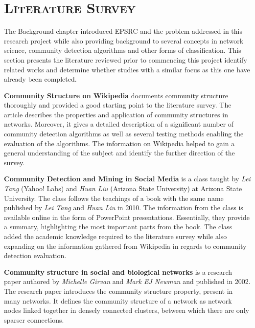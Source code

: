 \chapter{\textsc{Literature Survey}}
\label{chapterlabel3}

The Background chapter introduced EPSRC and the problem addressed in this research project while also providing background to several concepts in network science, community detection algorithms and other forms of classification. This section presents the literature reviewed prior to commencing this project identify related works and determine whether studies with a similar focus as this one have already been completed.

\vspace*{1em}

\textbf{Community Structure on Wikipedia} \cite{wikipedia_community_structure} documents community structure thoroughly and provided a good starting point to the literature survey. The article describes the properties and application of community structures in networks. Moreover, it gives a detailed description of a significant number of community detection algorithms as well as several testing methods enabling the evaluation of the algorithms. The information on Wikipedia helped to gain a general understanding of the subject and identify the further direction of the survey.

\vspace*{1em}

\textbf{Community Detection and Mining in Social Media} \cite{community_detection_class} is a class taught by \textit{Lei Tang} (Yahoo! Labs) and \textit{Huan Liu} (Arizona State University) at Arizona State University. The class follows the teachings of a book with the same name \cite{tang2010community} published by \textit{Lei Tang} and \textit{Huan Liu} in 2010. The information from the class is available online in the form of PowerPoint presentations. Essentially, they provide a summary, highlighting the most important parts from the book. The class added the academic knowledge required to the literature survey while also expanding on the information gathered from Wikipedia in regards to community detection evaluation.

\vspace*{1em}

\textbf{Community structure in social and biological networks} \cite{girvan2002community} is a research paper authored by \textit{Michelle Girvan} and \textit{Mark EJ Newman} and published in 2002. The research paper introduces the community structure property, present in many networks. It defines the community structure of a network as network nodes linked together in densely connected clusters, between which there are only sparser connections.

